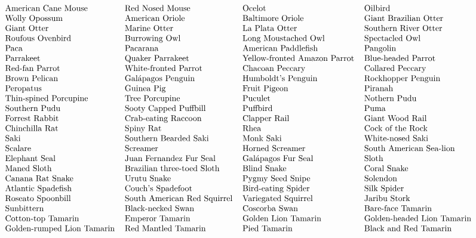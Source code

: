 \[\begin{tabular}{llll}
American Cane Mouse   & Red Nosed Mouse   & Ocelot  & Oilbird  \\
Wolly Opossum   & American Oriole  & Baltimore Oriole   & Giant Brazilian Otter  \\
Giant Otter  & Marine Otter   & La Plata Otter   & Southern River Otter \\
Roufous Ovenbird   & Burrowing Owl   & Long Moustached Owl  & Spectacled Owl  \\
Paca   & Pacarana  & American Paddlefish   & Pangolin  \\
Parrakeet  & Quaker Parrakeet   & Yellow-fronted Amazon Parrot   & Blue-headed Parrot \\
Red-fan Parrot   & White-fronted Parrot   & Chacoan Peccary  & Collared Peccary  \\
Brown Pelican   & Gal\'{a}pagos Penguin  & Humboldt's Penguin   & Rockhopper Penguin  \\
Peropatus  & Guinea Pig   & Fruit Pigeon   & Piranah \\
Thin-spined Porcupine   & Tree Porcupine   & Puculet  & Nothern Pudu  \\
Southern Pudu   & Sooty Capped Puffbill  & Puffbird   & Puma  \\
Forrest Rabbit  & Crab-eating Raccoon   & Clapper Rail   & Giant Wood Rail \\
Chinchilla Rat   & Spiny Rat   & Rhea  & Cock of the Rock  \\
Saki   & Southern Bearded Saki  & Monk Saki   & White-nosed Saki  \\
Scalare  & Screamer   & Horned Screamer   & South American Sea-lion \\
Elephant Seal   & Juan Fernandez Fur Seal   & Gal\'{a}pagos Fur Seal  & Sloth  \\
Maned Sloth   & Brazilian three-toed Sloth  & Blind Snake   & Coral Snake  \\
Canana Rat Snake  & Urutu Snake   & Pygmy Seed Snipe   & Solendon \\
Atlantic Spadefish   & Couch's Spadefoot   & Bird-eating Spider  & Silk Spider  \\
Roseato Spoonbill   & South American Red Squirrel  & Variegated Squirrel   & Jaribu Stork  \\
Sunbittern  & Black-necked Swan   & Coscorba Swan   & Bare-face Tamarin \\
Cotton-top Tamarin   & Emperor Tamarin   & Golden Lion Tamarin  & Golden-headed Lion Tamarin  \\
Golden-rumped Lion Tamarin   & Red Mantled Tamarin  & Pied Tamarin   & Black and Red Tamarin  \\

\end{tabular}\]
